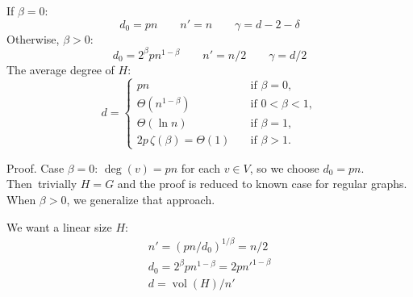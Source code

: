 \documentclass{beamer}
\DeclareMathOperator*{\vol}{vol}
\newcommand{\autotitle}{\secname\ifdefempty{\subsecname}{}{~--- \subsecname}}
\newcommand{\smalldisplayskips}{
    \setlength{\abovedisplayskip}{3pt}
    \setlength{\belowdisplayskip}{3pt}}
\begin{document}
\begin{frame}{\autotitle}
    \begin{theorem}[Cont.]
        \smalldisplayskips
        If $\beta=0$:
        \begin{equation*}
            d_0=pn
            \qquad n'=n
            \qquad\gamma=d-2-\delta
        \end{equation*}
        Otherwise, $\beta>0$:
        \begin{equation*}
            d_0=2^\beta pn^{1-\beta}
            \qquad n'=n/2
            \qquad\gamma=d/2
        \end{equation*}
        The average degree of $H$:
        \begin{equation*}
            d=
            \begin{cases}
                pn & \quad \text{if } \beta=0,\\
                \Theta(n^{1-\beta}) & \quad \text{if } 0<\beta<1,\\
                \Theta(\ln n) & \quad \text{if } \beta=1,\\
                2p\,\zeta(\beta)=\Theta(1) & \quad \text{if } \beta>1.
            \end{cases}
        \end{equation*}
    \end{theorem}
\end{frame}

\begin{frame}{\autotitle}
    \begin{block}{Proof.}
        Case $\beta=0$: $\deg(v)=pn$ for each $v\in V$, so we choose $d_0=pn$.
        Then~trivially $H=G$ and the proof is reduced to known case for regular graphs.
        When $\beta>0$, we generalize that approach.
        
        We want a linear size $H$:
        \begin{gather*}
            n'=(pn/d_0)^{1/\beta}=n/2\\
            d_0=2^\beta pn^{1-\beta}=2pn'^{1-\beta}\\
            d=\vol(H)/n'
        \end{gather*}
    \end{block}
\end{frame}
\end{document}
